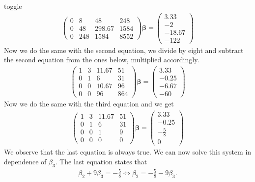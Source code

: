 \documentclass[letterpaper,10pt,english]{jupyterBook}
\begin{document}
\begin{enumerate}
\begin{enumerate}
\begin{sphinxuseclass}{toggle}
\begin{align*}
\begin{pmatrix}
0 &    8 &   48 &  248\\
0 &   48 &  298.67& 1584\\
0 &  248 & 1584 & 8552
\end{pmatrix}\bm\beta = 
\begin{pmatrix}
3.33\\-2\\-18.67\\-122
\end{pmatrix}
\end{align*}
\sphinxAtStartPar
Now we do the same with the second equation, we divide by eight and subtract the second equation from the ones below, multiplied accordingly.
\begin{align*}
\begin{pmatrix}
1 &    3 &   11.67 &   51\\
0  &   1  &   6 &   31\\
0  &   0  &  10.67 & 96\\
0  &   0  &  96 &  864
\end{pmatrix}\bm\beta = 
\begin{pmatrix}
3.33\\ -0.25\\ -6.67\\ -60
\end{pmatrix}
\end{align*}
\sphinxAtStartPar
Now we do the same with the third equation and we get
\begin{align*}
\begin{pmatrix}
1 &    3 &   11.67 &   51\\
0  &   1  &   6 &   31\\
0  &   0  &   1 & 9\\
0  &   0  &   0 &  0
\end{pmatrix}\bm\beta = 
\begin{pmatrix}
3.33\\ -0.25\\ -\frac{5}{8}\\ 0
\end{pmatrix}
\end{align*}
\sphinxAtStartPar
We observe that the last equation is always true. We can now solve this system in dependence of \(\beta_3\). The last equation states that
\begin{equation*}
\begin{split}\beta_2 + 9\beta_3 = -\frac{5}{8} \Leftrightarrow \beta_2 = -\frac{5}{8} -9\beta_3.\end{split}
\end{equation*}

\end{sphinxuseclass}
\end{enumerate}
\end{enumerate}
\end{document}
